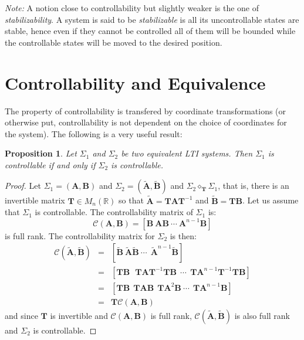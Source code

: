 \documentclass[a4paper,10pt,oneside]{book}
\newtheorem{proposition}[theorem]{Proposition}
\begin{document}
\emph{Note:} A notion close to controllability but slightly weaker is the one of \emph{stabilizability}. A system is said to be \emph{stabilizable} is all its uncontrollable states are stable, hence even if they cannot be controlled all of them will be bounded while the controllable states will be moved to the desired position.

\section{Controllability and Equivalence}
The property of controllability is transfered by coordinate transformations (or otherwise put, controllability is not dependent on the choice of coordinates for the system). The following is a very useful result:
\begin{proposition}\label{prop:ctrlEquiv}
 Let $\Sigma_1$ and $\Sigma_2$ be two equivalent LTI systems. Then $\Sigma_1$ is controllable if and only if $\Sigma_2$ is controllable.
\end{proposition}
\begin{proof}
 Let $\Sigma_1=(\mathbf{A},\mathbf{B})$ and $\Sigma_2=(\tilde{\mathbf{A}},\tilde{\mathbf{B}})$ and $\Sigma_2\diamond_{\mathbf{T}}\Sigma_1$, that is, there is an invertible matrix $\mathbf{T}\in M_n(\mathbb{R})$ so that $\tilde{\mathbf{A}}=\mathbf{TAT}^{-1}$ and $\tilde{\mathbf{B}}=\mathbf{TB}$. Let us assume that $\Sigma_1$ is controllable. The controllability matrix of $\Sigma_1$ is:
\begin{equation}
 \mathcal{C}(\mathbf{A},\mathbf{B})=[\mathbf{B}\ \mathbf{AB}\ \cdots\ \mathbf{A}^{n-1}\mathbf{B}]
\end{equation}
is full rank. The controllability matrix for $\Sigma_2$ is then:
\begin{eqnarray}
 \mathcal{C}(\tilde{\mathbf{A}},\tilde{\mathbf{B}})&=&[\tilde{\mathbf{B}}\ \tilde{\mathbf{A}}\tilde{\mathbf{B}}\ \cdots\ \ \tilde{\mathbf{A}}^{n-1}\tilde{\mathbf{B}}]\\
 &=&\left[\mathbf{TB}\ \ \ \mathbf{TAT}^{-1}\mathbf{TB}\ \ \cdots\ \ \mathbf{TA}^{n-1}\mathbf{T}^{-1}\mathbf{TB}\right]\\
 &=&\left[\mathbf{TB}\ \ \mathbf{TAB}\ \ \mathbf{TA}^2\mathbf{B}\ \cdots\ \ \mathbf{TA}^{n-1}\mathbf{B}  \right]\\
 &=&\mathbf{T}\mathcal{C}(\mathbf{A},\mathbf{B})
\end{eqnarray}
and since $\mathbf{T}$ is invertible and $\mathcal{C}(\mathbf{A},\mathbf{B})$ is full rank, $\mathcal{C}(\tilde{\mathbf{A}},\tilde{\mathbf{B}})$ is also full rank and $\Sigma_2$ is controllable.
\end{proof}
\end{document}
